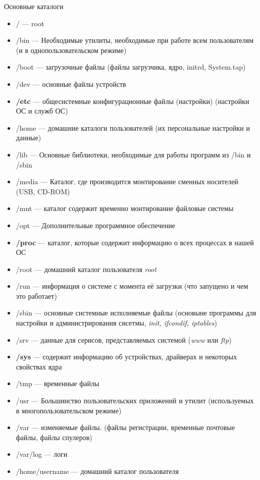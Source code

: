 \documentclass[oneside, final, 14pt]{extreport} %
\begin{document}
Основные каталоги
\begin{itemize}
    \item / --- root
    \item /bin --- Необходимые утилиты, необходимые при работе всем пользователям (и в однопользовательском режиме)
    \item /boot --- загрузочные файлы (файлы загрузчика, ядро, initrd, System.tap)
    \item /dev --- основные файлы устройств
    \item \textbf{/etc} --- общесистемные конфигурационные файлы (настройки) (настройки ОС и служб ОС)
    \item /home --- домашние каталоги пользователей (их персональные настройки и данные)
    \item /lib --- Основные библиотеки, необходимые для работы программ из /bin и /sbin 
    \item /media --- Каталог, где производится монтирование сменных носителей (USB, CD-ROM)
    \item /mnt --- каталог содержит временно монтирование файловые системы 
    \item /opt --- Дополнительные программное обеспечение 
    \item \textbf{/proc} --- каталог, которые содержит информацию о всех процессах в нашей ОС
    \item /root --- домашний каталог пользователя \textit{root}
    \item /run --- информация о системе с момента её загрузки (что запущено и чем это работает)
    \item /sbin --- основные системные исполняемые файлы (основыне программы для настройки и администрирования сисетмы, \textit{init, ifcondif, iptables})
    \item /srv --- данные для серисов, представляемых системой (\textit{www} или \textit{ftp})
    \item \textbf{/sys} --- содержит информацию об устройствах, драйверах и некоторых свойствах ядра
    \item /tmp --- временные файлы
    \item /usr --- Большинство пользовательских приложений и утилит (используемых в многопользовательском режиме)
    \item /var --- изменяемые файлы. (файлы регистрации, временные почтовые файлы, файлы спулеров)
    \item /var/log --- логи
    \item /home/username --- домашний каталог пользователя 
\end{itemize}
\end{document}
